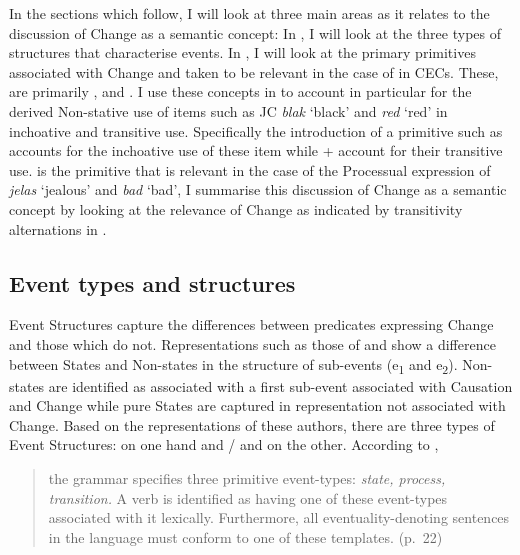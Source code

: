 In the sections which follow, I will look at three main areas as it
relates to the discussion of Change as a semantic concept: In
, I will look at the three types of structures that
characterise events.  In , I will look at the
primary primitives associated with Change and taken to be relevant in
the case of  in CECs.  These, are primarily \CAUSE,
\BECOME and \DO.  I use these concepts in  to account in
particular for the derived Non-stative use of items such as JC
\textit{blak} `black' and \textit{red} `red' in inchoative and
transitive use.  Specifically the introduction of a primitive such as
\BECOME accounts for the inchoative use of these item while \BECOME +
\CAUSE account for their transitive use.  \DO is the primitive that is
relevant in the case of the Processual expression of \textit{jelas}
`jealous' and \textit{bad} `bad',  I summarise this discussion of
Change as a semantic concept by looking at the relevance of Change as
indicated by transitivity alternations in .


\subsection{Event types and structures}\label{sec:4.2.1}

Event Structures capture the differences between predicates expressing
Change and those which do not.  Representations such as those of
\citet{Pustejovsky1988,Pustejovsky1991} and \citet{Grimshaw1990} show
a difference between States and Non-states in the structure of
sub-events (e\textsubscript{1} and e\textsubscript{2}).  Non-states
are identified as associated with a first sub-event associated with
Causation and Change while pure States are captured in representation
not associated with Change.  Based on the representations of these
authors, there are three types of Event Structures:  on one hand
and \slash {} and  on the other.  According to \citet{Pustejovsky1988},

\begin{quote}
the grammar specifies three primitive event-types: \textit{state,
  process, transition.}  A verb is identified as having one of these
event-types associated with it lexically.  Furthermore, all
eventuality-denoting sentences in the language must conform to one of
these templates. (p.~22)
\end{quote}

